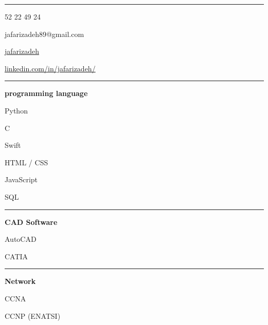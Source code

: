 \documentclass{letter}
\newcommand{\divider}{\rule{\linewidth}{0.9pt}}
\begin{document}
\small
\begin{minipage}[t]{0.40\textwidth}
\setlength{\baselineskip}{1.5\baselineskip}
\color{white}
\vspace{5mm}



\vspace{5mm}

\divider


\faPhone {} 52 22 49 24

\faEnvelope \quad jafarizadeh89@gmail.com

\faGithub \quad \href{https://github.com/jafarizadeh}{jafarizadeh}

\faLinkedin \quad \href{https://www.linkedin.com/in/jafarizadeh/}{linkedin.com/in/jafarizadeh/}


\divider


{\large \textbf{programming language}}

\faCircleNotch \quad Python

\faCircleNotch \quad C

\faCircleNotch \quad Swift

\faCircleNotch \quad HTML / CSS

\faCircleNotch \quad JavaScript

\faCircleNotch \quad SQL

\divider


{\large \textbf{CAD Software}}

\faCircleNotch \quad AutoCAD

\faCircleNotch \quad CATIA

\divider



{\large \textbf{Network}}

\faNetworkWired \quad CCNA

\faNetworkWired \quad CCNP (ENATSI)

\end{minipage}
\end{document}

